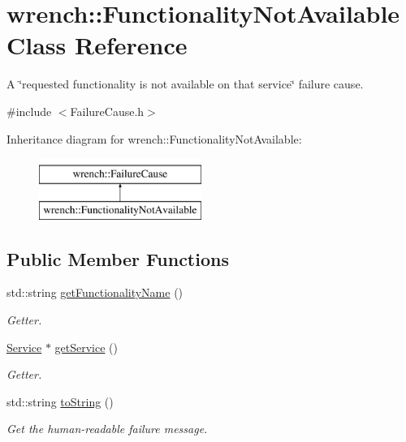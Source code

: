 \hypertarget{classwrench_1_1_functionality_not_available}{}\section{wrench\+:\+:Functionality\+Not\+Available Class Reference}
\label{classwrench_1_1_functionality_not_available}


A \char`\"{}requested functionality is not available on that service\char`\"{} failure cause.  




{\ttfamily \#include $<$Failure\+Cause.\+h$>$}

Inheritance diagram for wrench\+:\+:Functionality\+Not\+Available\+:\begin{figure}[H]
\begin{center}
\leavevmode
\includegraphics[height=2.000000cm]{classwrench_1_1_functionality_not_available}
\end{center}
\end{figure}
\subsection*{Public Member Functions}
\begin{DoxyCompactItemize}
\item 
std\+::string \hyperlink{classwrench_1_1_functionality_not_available_ab08a243a126daa6dfc538a7429f656b0}{get\+Functionality\+Name} ()
\begin{DoxyCompactList}\small\item\em Getter. \end{DoxyCompactList}\item 
\hyperlink{classwrench_1_1_service}{Service} $\ast$ \hyperlink{classwrench_1_1_functionality_not_available_a0c29976839df8de89c833e135f754bbb}{get\+Service} ()
\begin{DoxyCompactList}\small\item\em Getter. \end{DoxyCompactList}\item 
std\+::string \hyperlink{classwrench_1_1_functionality_not_available_af19ea11f7e3d50d0bea7c8a66b7b1221}{to\+String} ()
\begin{DoxyCompactList}\small\item\em Get the human-\/readable failure message. \end{DoxyCompactList}\end{DoxyCompactItemize}
